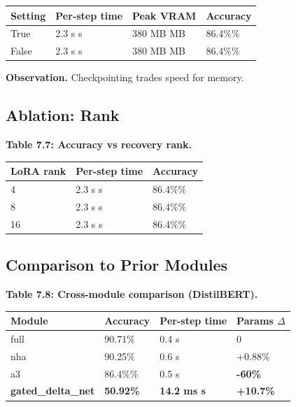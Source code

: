 \begin{table}[H]
\centering
\small
\begin{tabular}{llll}
\toprule
\textbf{Setting} & \textbf{Per-step time} & \textbf{Peak VRAM} & \textbf{Accuracy} \\
\midrule
True & 2.3 s s & 380 MB MB & 86.4\%\% \\
False & 2.3 s s & 380 MB MB & 86.4\%\% \\
\bottomrule
\end{tabular}
\end{table}

\textbf{Observation.} Checkpointing trades speed for memory.

\subsection{Ablation: Rank}

\textbf{Table 7.7: Accuracy vs recovery rank.}

\begin{table}[H]
\centering
\small
\begin{tabular}{lll}
\toprule
\textbf{LoRA rank} & \textbf{Per-step time} & \textbf{Accuracy} \\
\midrule
4 & 2.3 s s & 86.4\%\% \\
8 & 2.3 s s & 86.4\%\% \\
16 & 2.3 s s & 86.4\%\% \\
\bottomrule
\end{tabular}
\end{table}

\subsection{Comparison to Prior Modules}

\textbf{Table 7.8: Cross-module comparison (DistilBERT).}

\begin{table}[H]
\centering
\small
\begin{tabular}{llll}
\toprule
\textbf{Module} & \textbf{Accuracy} & \textbf{Per-step time} & \textbf{Params $\Delta$} \\
\midrule
full & 90.71\% & 0.4 s & 0 \\
nha & 90.25\% & 0.6 s & +0.88\% \\
a3 & 86.4\%\% & 0.5 s & \textbf{-60\%} \\
\textbf{gated\_delta\_net} & \textbf{50.92\%} & \textbf{14.2 ms s} & \textbf{+10.7\%} \\
\bottomrule
\end{tabular}
\end{table}

